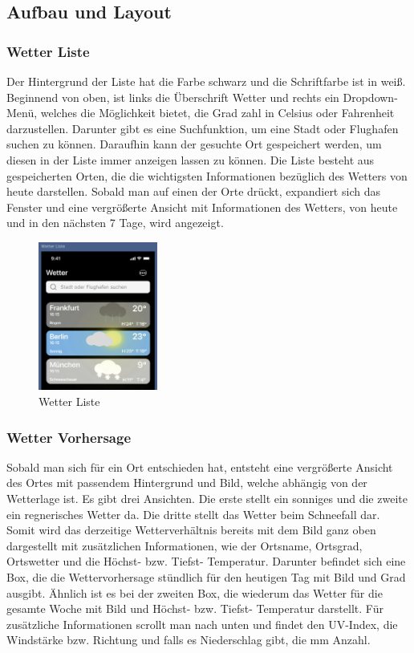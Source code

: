 \documentclass{article}
\begin{document}
\subsection{Aufbau und Layout}
\subsubsection{Wetter Liste}
Der Hintergrund der Liste hat die Farbe schwarz und die Schriftfarbe ist in weiß. Beginnend von oben, ist links die Überschrift Wetter und rechts ein Dropdown-Menü, welches die Möglichkeit bietet, die Grad zahl in Celsius oder Fahrenheit darzustellen. Darunter gibt es eine Suchfunktion, um eine Stadt oder Flughafen suchen zu können. Daraufhin kann der gesuchte Ort gespeichert werden, um diesen in der Liste immer anzeigen lassen zu können. Die Liste besteht aus gespeicherten Orten, die die wichtigsten Informationen bezüglich des Wetters von heute darstellen. Sobald man auf einen der Orte drückt, expandiert sich das Fenster und eine vergrößerte Ansicht mit Informationen des Wetters, von heute und in den nächsten 7 Tage, wird angezeigt. 

\begin{figure}[ht]
\centering
\includegraphics[width=0.35\textwidth]{wetterliste.png}
\caption{Wetter Liste}
\end{figure}

\subsubsection{Wetter Vorhersage}
Sobald man sich für ein Ort entschieden hat, entsteht eine vergrößerte Ansicht des Ortes mit passendem Hintergrund und Bild, welche abhängig von der Wetterlage ist. Es gibt drei Ansichten. Die erste stellt ein sonniges und die zweite ein regnerisches Wetter da. Die dritte stellt das Wetter beim Schneefall dar. Somit wird das derzeitige Wetterverhältnis bereits mit dem Bild ganz oben dargestellt mit zusätzlichen Informationen, wie der Ortsname, Ortsgrad, Ortswetter und die Höchst- bzw. Tiefst- Temperatur. Darunter befindet sich eine Box, die die Wettervorhersage stündlich für den heutigen Tag mit Bild und Grad ausgibt. Ähnlich ist es bei der zweiten Box, die wiederum das Wetter für die gesamte Woche mit Bild und Höchst- bzw. Tiefst- Temperatur darstellt. Für zusätzliche Informationen scrollt man nach unten und findet den UV-Index, die Windstärke bzw. Richtung und falls es Niederschlag gibt, die mm Anzahl.
\end{document}
